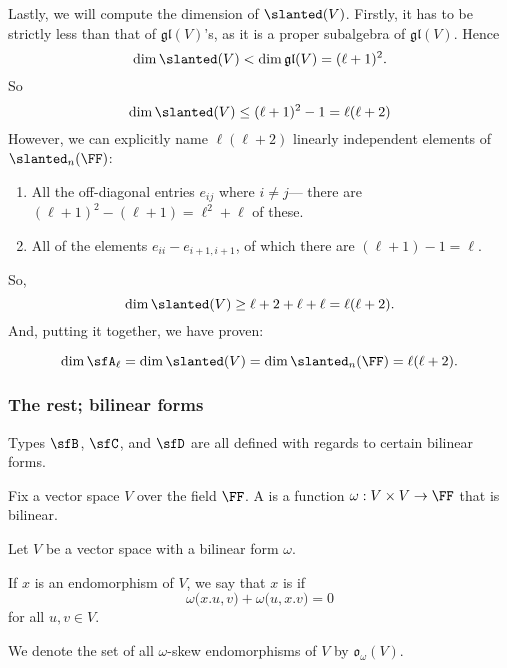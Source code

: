 \documentclass{article}
\newcommand*\gl{\ensuremath{\mathfrak{gl}}}
\let\sl\slanted
\newcommand*\sl{\ensuremath{\mathfrak{sl}}}
\newcommand*\oalg{\ensuremath{\mathfrak{o}}}
\newcommand*\acts{.}
\begin{document}
Lastly, we will compute the dimension of $\sl(V)$.
Firstly, it has to be strictly less than that of $\gl(V)$'s, as it is a proper subalgebra of $\gl(V)$.
Hence
\[
    \dim \sl(V) < \dim \gl(V) = (\ell+1)^2.
\]
So
\[
    \dim \sl(V) \leq (\ell+1)^2 - 1 = \ell(\ell+2)
\]
However, we can explicitly name $\ell(\ell+2)$ linearly independent elements of $\sl_n(\FF)$:
\begin{enumerate}
    \item 
        All the off-diagonal entries $e_{ij}$ where $i \neq j$--- there are $(\ell+1)^2 - (\ell + 1) = \ell^2 + \ell$ of these.
    \item 
        All of the elements $e_{ii} - e_{i+1,i+1}$, of which there are $(\ell + 1) -1 = \ell$. 
\end{enumerate}
So,
\[
    \dim \sl(V) \geq \ell+2 + \ell + \ell = \ell(\ell + 2).
\]
And, putting it together, we have proven:
\begin{proposition}
    \[
        \dim \sfA_\ell
        =
        \dim \sl(V)
        =
        \dim \sl_n(\FF)
        =
        \ell(\ell+2).
    \]
\end{proposition}

\subsubsection{The rest; bilinear forms}

Types $\sfB$, $\sfC$, and $\sfD$ are all defined with regards to certain bilinear forms.

Fix a vector space $V$ over the field $\FF$.
A  is a function $\omega: V \times V \to \FF$ that is bilinear.

\begin{definition}
    Let $V$ be a vector space with a bilinear form $\omega$.

    If $x$ is an endomorphism of $V$, we say that $x$ is  if
    \[
        \omega\Big(x\acts u, v\Big)
        + \omega\Big(u,x \acts v\Big)
        =
        0
    \]
    for all $u, v \in V$.

    We denote the set of all $\omega$-skew endomorphisms of $V$ by $\oalg_\omega(V)$.
\end{definition}
\end{document}
